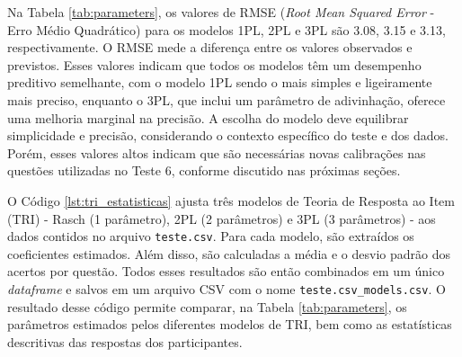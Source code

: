 Na Tabela \ref{tab:parameters}, os valores de RMSE (\textit{Root Mean Squared Error} - Erro Médio Quadrático) para os modelos 1PL, 2PL e 3PL são 3.08, 3.15 e 3.13, respectivamente.  O RMSE mede a diferença entre os valores observados e previstos.  Esses valores indicam que todos os modelos têm um desempenho preditivo semelhante, com o modelo 1PL sendo o mais simples e ligeiramente mais preciso, enquanto o 3PL, que inclui um parâmetro de adivinhação, oferece uma melhoria marginal na precisão. A escolha do modelo deve equilibrar simplicidade e precisão, considerando o contexto específico do teste e dos dados. Porém, esses valores altos indicam que são necessárias novas calibrações nas questões utilizadas no Teste 6, conforme discutido nas próximas seções.

O Código \ref{lst:tri_estatisticas} ajusta três modelos de Teoria de Resposta ao Item (TRI) - Rasch (1 parâmetro), 2PL (2 parâmetros) e 3PL (3 parâmetros) - aos dados contidos no arquivo \verb|teste.csv|. Para cada modelo, são extraídos os coeficientes estimados. Além disso, são calculadas a média e o desvio padrão dos acertos por questão. Todos esses resultados são então combinados em um único \textit{dataframe} e salvos em um arquivo CSV com o nome \verb|teste.csv_models.csv|. O resultado desse código permite comparar, na Tabela \ref{tab:parameters}, os parâmetros estimados pelos diferentes modelos de TRI, bem como as estatísticas descritivas das respostas dos participantes.


